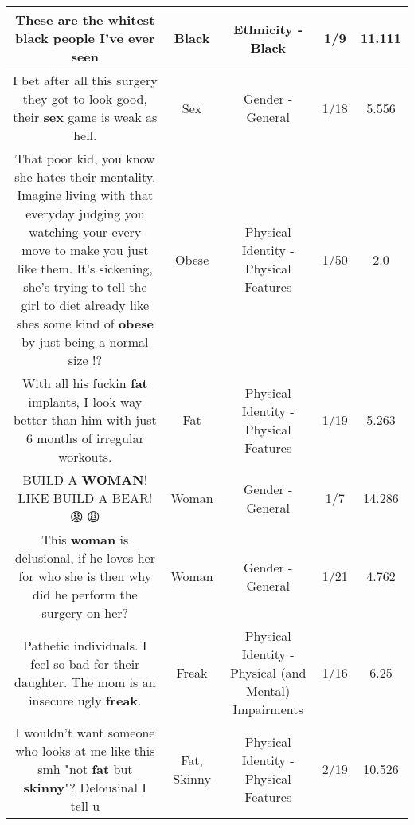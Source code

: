 \documentclass[11pt]{article}
\newlength\mylength
\begin{document}
\begin{center}
\begin{longtable}{|C{.65\mylength}|C{.30\mylength}|C{.12\mylength}|C{.12\mylength}|C{.12\mylength}|}
  \small These are the whitest \textbf{black} people I've ever seen\normalsize   & Black & Ethnicity - Black & 1/9 & 11.111 \\  \hline
  \small I bet after all this surgery they got to look good, their \textbf{sex} game is weak as hell.\normalsize   & Sex & Gender - General & 1/18 & 5.556 \\  \hline
  \small That poor kid, you know she hates their mentality. Imagine living with that everyday judging you watching your every move to make you just like them. It's sickening, she's trying to tell the girl to diet already like shes some kind of \textbf{obese} by just being a normal size !?\normalsize   & Obese & Physical Identity - Physical Features & 1/50 & 2.0 \\  \hline
  \small With all his fuckin \textbf{fat} implants, I look way better than him with just 6 months of irregular workouts.\normalsize   & Fat & Physical Identity - Physical Features & 1/19 & 5.263 \\  \hline
  \small BUILD A \textbf{WOMAN}! LIKE BUILD A BEAR!😡🤕😩\normalsize   & Woman & Gender - General & 1/7 & 14.286 \\  \hline
  \small This \textbf{woman} is delusional, if he loves her for who she is then why did he perform the surgery on her?\normalsize   & Woman & Gender - General & 1/21 & 4.762 \\  \hline
  \small Pathetic individuals. I feel so bad for their daughter. The mom is an insecure ugly \textbf{freak}.\normalsize   & Freak & Physical Identity - Physical (and Mental) Impairments & 1/16 & 6.25 \\  \hline
  \small I wouldn't want someone who looks at me like this smh "not \textbf{fat} but \textbf{skinny}"? Delousinal I tell u\normalsize   & Fat, Skinny & Physical Identity - Physical Features & 2/19 & 10.526 \\  \hline

\end{longtable}
\end{center}
\end{document}
